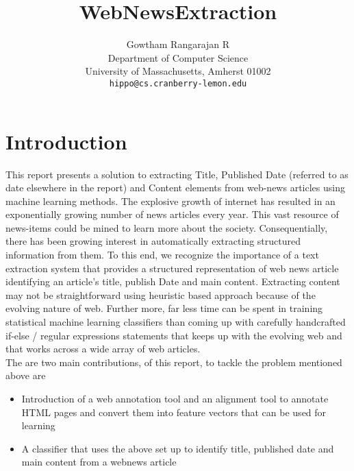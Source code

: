 \documentclass{article} %
\title{WebNewsExtraction}
\author{
Gowtham Rangarajan R \\
Department of Computer Science\\
University of Massachusetts, Amherst 01002 \\
\texttt{hippo@cs.cranberry-lemon.edu} \\
}
\begin{document}
\maketitle


\section{Introduction}
\label{sec:intro}

This report presents a solution to extracting Title, Published Date (referred to as date elsewhere in the report) and Content elements from web-news articles using machine learning methods. 
The explosive growth of internet has resulted in an exponentially growing number of news articles every year. This vast resource of news-items could be mined to learn more about the society. Consequentially, there has been growing interest in automatically extracting structured information from them.  To this end, we recognize the importance of a text extraction system that provides a structured representation of web news article identifying an article's title, publish Date and main content. Extracting content may not be straightforward using heuristic based approach because of the evolving nature of web. Further more, far less time can be spent in training statistical machine learning classifiers than coming up with carefully handcrafted if-else / regular expressions statements that keeps up with the evolving web and that works across a wide array of web articles. \\
The are two main contributions, of this report, to tackle the problem mentioned above are\\
\begin{itemize}
    \item Introduction of a web annotation tool and an alignment tool to annotate HTML pages and convert them into feature vectors that can be used for learning 
    \item A classifier that uses the above set up to identify title, published date and main content from a webnews article
\end{itemize}
\end{document}
